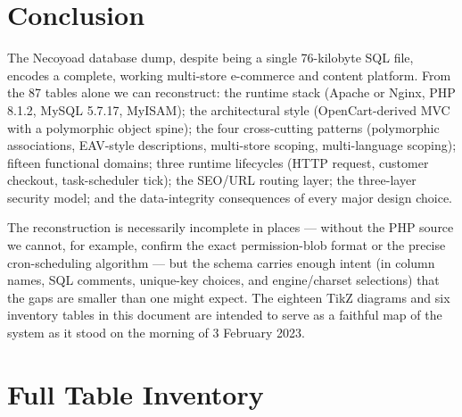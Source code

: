 \documentclass[11pt,a4paper]{article}
\begin{document}
\section{Conclusion}\label{sec:conclusion}

The Necoyoad database dump, despite being a single 76-kilobyte
SQL file, encodes a complete, working multi-store e-commerce
and content platform. From the 87 tables alone we can
reconstruct: the runtime stack (Apache or Nginx, PHP 8.1.2,
MySQL 5.7.17, MyISAM); the architectural style (OpenCart-derived
MVC with a polymorphic object spine); the four cross-cutting
patterns (polymorphic associations, EAV-style descriptions,
multi-store scoping, multi-language scoping); fifteen functional
domains; three runtime lifecycles (HTTP request, customer
checkout, task-scheduler tick); the SEO/URL routing layer; the
three-layer security model; and the data-integrity consequences
of every major design choice.

The reconstruction is necessarily incomplete in places ---
without the PHP source we cannot, for example, confirm the exact
permission-blob format or the precise cron-scheduling algorithm
--- but the schema carries enough intent (in column names, SQL
comments, unique-key choices, and engine/charset selections)
that the gaps are smaller than one might expect. The eighteen
TikZ diagrams and six inventory tables in this document are
intended to serve as a faithful map of the system as it stood
on the morning of 3 February 2023.

\appendix

\section{Full Table Inventory}\label{app:inventory}
\end{document}
